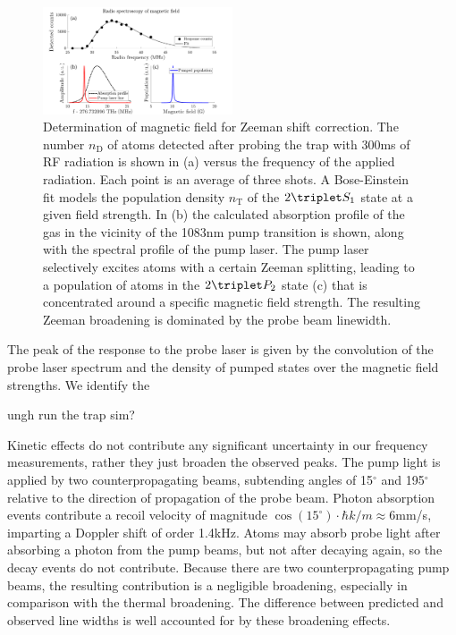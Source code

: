 \begin{figure}[b]
\includegraphics[width=0.5\textwidth]{fig/spectroscopy/rf_spec_subfig-eps-converted-to.pdf}
\caption{Determination of magnetic field for Zeeman shift correction.
	The number $n_\text{D}$ of atoms detected after probing the trap with 300ms of RF radiation is shown in (a) versus the frequency of the applied radiation.
	Each point is an average of three shots.
	A Bose-Einstein fit models the population density $n_\text{T}$ of the $2\triplet S_1$ state at a given field strength.
	In (b) the calculated absorption profile of the gas in the vicinity of the 1083nm pump transition is shown, along with the spectral profile of the pump laser.
	The pump laser selectively excites atoms with a certain Zeeman splitting, leading to a population of atoms in the $2\triplet P_2$ state (c) that is concentrated around a specific magnetic field strength.
	The resulting Zeeman broadening is dominated by the probe beam linewidth.}
\label{fig:RF_spec}
\end{figure}

	The peak of the response to the probe laser is given by the convolution of the probe laser spectrum and the density of pumped states over the magnetic field strengths.
	We identify the 

	ungh run the trap sim?

Kinetic effects do not contribute any significant uncertainty in our frequency measurements, rather they just broaden the observed peaks.
	The pump light is applied by two counterpropagating beams, subtending angles of 15$^\circ$ and 195$^\circ$ relative to the direction of propagation of the probe beam.
	Photon absorption events contribute a recoil velocity of magnitude $\cos(15^\circ)\cdot\hbar k/m\approx6$mm/s, imparting a Doppler shift of order 1.4kHz.
	Atoms may absorb probe light after absorbing a photon from the pump beams, but not after decaying again, so the decay events do not contribute.
	Because there are two counterpropagating pump beams, the resulting contribution is a negligible broadening, especially in comparison with the thermal broadening.
	The difference between predicted and observed line widths is well accounted for by these broadening effects.

